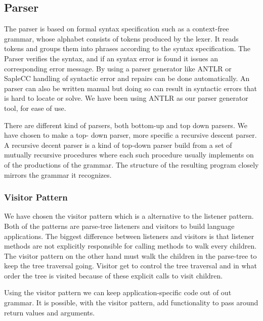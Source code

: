 \subsection*{Parser}
The parser is based on formal syntax specification such as a context-free grammar, whose alphabet consists of tokens produced by the lexer. 
It reads tokens and groups them into phrases according to the syntax specification.
The Parser verifies the syntax, and if an syntax error is found it issues an corresponding error message.
 \citep{Crafting}
By using a parser generator like ANTLR or SapleCC handling of syntactic error and repairs can be done automatically.
An parser can also be written manual but doing so can result in syntactic errors that is hard to locate or solve.
We have been using ANTLR as our parser generator tool, for ease of use.

There are different kind of parsers, both bottom-up and top down parsers.
We have chosen to make a top- down parser, more specific a recursive descent parser.
A recursive decent parser is a kind of top-down parser build from a set of mutually recursive procedures where each such procedure usually implements on of the productions of the grammar.
The structure of the resulting program closely mirrors the grammar it recognizes.\citep{Recursive_programming}

\subsubsection*{Visitor Pattern}
We have chosen the visitor pattern which is a alternative to the listener pattern.
Both of the patterns are parse-tree listeners and visitors to build language applications.
The biggest difference between listeners and visitors is that listener methods are not explicitly responsible for calling methods to walk every children.
The visitor pattern on the other hand must walk the children in the parse-tree to keep the tree traversal going.
Visitor get to control the tree traversal and in what order the tree is visited because of these explicit calls to visit children.\citep{ANTLR4_Book}

Using the visitor pattern we can keep application-specific code out of out grammar.
It is possible, with the visitor pattern, add functionality to pass around return values and arguments.
